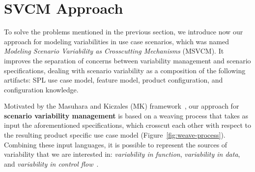 \documentclass{acm_proc_article-sp}
\begin{document}
%


\section{SVCM Approach}
\label{sec:svmc}

To solve the problems mentioned in the previous section, we introduce now our
approach for modeling variabilities in use case scenarios, which was named
\emph{Modeling Scenario Variability as Crosscutting Mechanisms} (MSVCM). It
improves the separation of concerns between variability management and scenario
specifications, dealing with scenario variability as a composition of the
following artifacts: SPL use case model, feature model, product configuration,
and configuration knowledge.

Motivated by the Masuhara and Kiczales (MK) framework~\cite{Masuhara:2003aa}, our
approach for \textbf{scenario variability management} is based on a weaving
process that takes as input the aforementioned specifications, which crosscut
each other with respect to the resulting product specific use case model
(Figure~\ref{fig:weave-process}). Combining these input languages, it is possible
to represent the sources of variability that we are interested in:
\emph{variability in function}, \emph{variability in data}, and \emph{variability in
control flow}~\cite{Bachmann:2001aa}.
\end{document}
